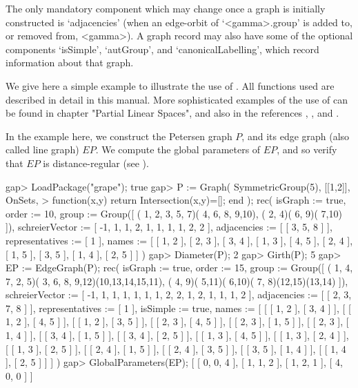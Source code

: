 The only mandatory component which may change once a graph is initially
constructed is `adjacencies' (when an edge-orbit of `<gamma>.group' is
added to, or removed from, <gamma>). A graph record may also have some
of the optional components `isSimple', `autGroup', and
`canonicalLabelling', which record information about that graph.


We give here a simple example to illustrate the use of {\GRAPE}. All
functions used are described in detail in this manual. More
sophisticated examples of the use of {\GRAPE} can be found in
chapter "Partial Linear Spaces", and also in the references \cite{Cam99},
\cite{CSS99}, \cite{HL99} and \cite{Soi06}.

In the example here, we construct the Petersen graph $P$, and its edge
graph (also called line graph) $EP$. We compute the global parameters
of $EP$, and so verify that $EP$ is distance-regular (see \cite{BCN89}).

\beginexample
gap> LoadPackage("grape");
true
gap> P := Graph( SymmetricGroup(5), [[1,2]], OnSets,
>             function(x,y) return Intersection(x,y)=[]; end );
rec( isGraph := true, order := 10, 
  group := Group([ ( 1, 2, 3, 5, 7)( 4, 6, 8, 9,10), ( 2, 4)( 6, 9)( 7,10) ]),
  schreierVector := [ -1, 1, 1, 2, 1, 1, 1, 1, 2, 2 ], 
  adjacencies := [ [ 3, 5, 8 ] ], representatives := [ 1 ], 
  names := [ [ 1, 2 ], [ 2, 3 ], [ 3, 4 ], [ 1, 3 ], [ 4, 5 ], [ 2, 4 ], 
      [ 1, 5 ], [ 3, 5 ], [ 1, 4 ], [ 2, 5 ] ] )
gap> Diameter(P);
2
gap> Girth(P);
5
gap> EP := EdgeGraph(P);
rec( isGraph := true, order := 15, 
  group := Group([ ( 1, 4, 7, 2, 5)( 3, 6, 8, 9,12)(10,13,14,15,11), 
      ( 4, 9)( 5,11)( 6,10)( 7, 8)(12,15)(13,14) ]), 
  schreierVector := [ -1, 1, 1, 1, 1, 1, 1, 2, 2, 1, 2, 1, 1, 1, 2 ], 
  adjacencies := [ [ 2, 3, 7, 8 ] ], representatives := [ 1 ], 
  isSimple := true, 
  names := [ [ [ 1, 2 ], [ 3, 4 ] ], [ [ 1, 2 ], [ 4, 5 ] ], 
      [ [ 1, 2 ], [ 3, 5 ] ], [ [ 2, 3 ], [ 4, 5 ] ], [ [ 2, 3 ], [ 1, 5 ] ], 
      [ [ 2, 3 ], [ 1, 4 ] ], [ [ 3, 4 ], [ 1, 5 ] ], [ [ 3, 4 ], [ 2, 5 ] ], 
      [ [ 1, 3 ], [ 4, 5 ] ], [ [ 1, 3 ], [ 2, 4 ] ], [ [ 1, 3 ], [ 2, 5 ] ], 
      [ [ 2, 4 ], [ 1, 5 ] ], [ [ 2, 4 ], [ 3, 5 ] ], [ [ 3, 5 ], [ 1, 4 ] ], 
      [ [ 1, 4 ], [ 2, 5 ] ] ] )
gap> GlobalParameters(EP);
[ [ 0, 0, 4 ], [ 1, 1, 2 ], [ 1, 2, 1 ], [ 4, 0, 0 ] ]
\endexample
